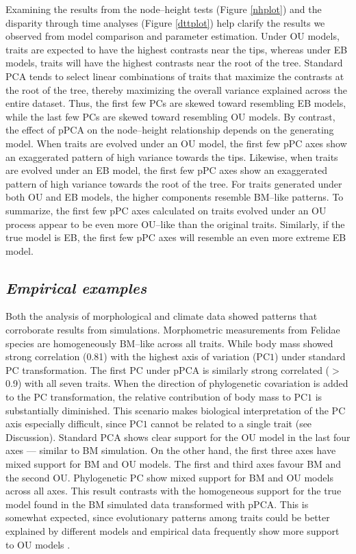 \documentclass[a4paper,12pt]{article}
\begin{document}
Examining the results from the node--height tests (Figure \ref{nhplot}) and the disparity through time analyses (Figure \ref{dttplot}) help clarify the results we observed from model comparison and parameter estimation. 
Under OU models, traits are expected to have the highest contrasts near the tips, whereas under EB models, traits will have the highest contrasts near the root of the tree. Standard PCA tends to select linear combinations of traits that maximize the contrasts at the root of the tree, thereby maximizing the overall variance explained across the entire dataset. Thus, the first few PCs are skewed toward resembling EB models, while the last few PCs are skewed toward resembling OU models. By contrast, the effect of pPCA on the node--height relationship depends on the generating model. When traits are evolved under an OU model, the first few pPC axes show an exaggerated pattern of high variance towards the tips. Likewise, when traits are evolved under an EB model, the first few pPC axes show an exaggerated pattern of high variance towards the root of the tree. For traits generated under both OU and EB models, the higher components resemble BM--like patterns. To summarize, the first few pPC axes calculated on traits evolved under an OU process appear to be even more OU--like than the original traits. Similarly, if the true model is EB, the first few pPC axes will resemble an even more extreme EB model.

\subsection{\emph{Empirical examples}}
Both the analysis of morphological and climate data showed patterns that corroborate results from simulations. Morphometric measurements from Felidae species are homogeneously BM--like across all traits. While body mass showed strong correlation (0.81) with the highest axis of variation (PC$1$) under standard PC transformation. The first PC under pPCA is similarly strong correlated ($>$0.9) with all seven traits. When the direction of phylogenetic covariation is added to the PC transformation, the relative contribution of body mass to PC$1$ is substantially diminished. This scenario makes biological interpretation of the PC axis especially difficult, since PC$1$ cannot be related to a single trait (see Discussion). Standard PCA shows clear support for the OU model in the last four axes --- similar to BM simulation. On the other hand, the first three axes have mixed support for BM and OU models. The first and third axes favour BM and the second OU. Phylogenetic PC show mixed support for BM and OU models across all axes. This result contrasts with the homogeneous support for the true model found in the BM simulated data transformed with pPCA. This is somewhat expected, since evolutionary patterns among traits could be better explained by different models and empirical data frequently show more support to OU models \citep{Harmon2010}.
\end{document}
